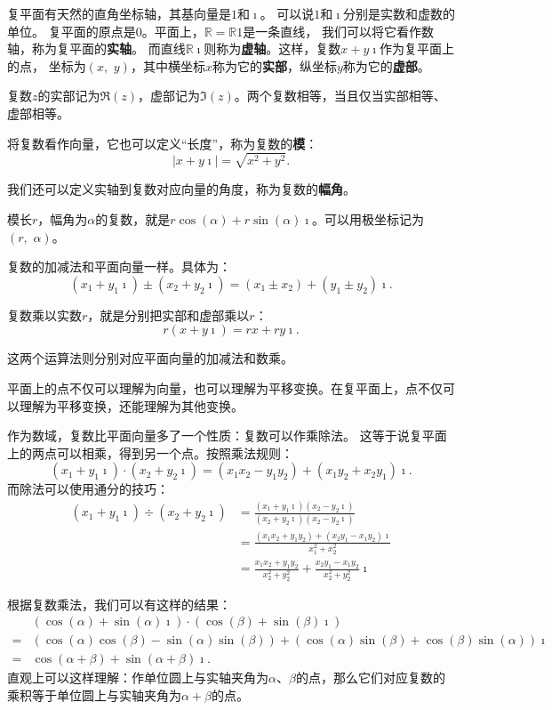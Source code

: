 \documentclass[12pt,UTF8]{ctexbook}
\theoremstyle{definition}
\theoremstyle{plain}
\begin{document}
复平面有天然的直角坐标轴，其基向量是$1$和$\imath$。
可以说$1$和$\imath$分别是实数和虚数的单位。
复平面的原点是$0$。平面上，$\mathbb{R} = \mathbb{R}1$是一条直线，
我们可以将它看作数轴，称为复平面的\textbf{实轴}。
而直线$\mathbb{R}\imath$则称为\textbf{虚轴}。这样，复数$x+y\imath$作为复平面上的点，
坐标为$(x,\,\,y)$，其中横坐标$x$称为它的\textbf{实部}，纵坐标$y$称为它的\textbf{虚部}。

复数$z$的实部记为$\Re(z)$，虚部记为$\Im(z)$。两个复数相等，当且仅当实部相等、虚部相等。

将复数看作向量，它也可以定义“长度”，称为复数的\textbf{模}：
$$ |x + y\imath| = \sqrt{x^2 + y^2}.$$

我们还可以定义实轴到复数对应向量的角度，称为复数的\textbf{幅角}。

模长$r$，幅角为$\alpha$的复数，就是$r\cos{(\alpha)} + r\sin{(\alpha)}\imath$。可以用极坐标记为$(r,\,\,\alpha)$。

复数的加减法和平面向量一样。具体为：
$$ (x_1 + y_1\imath) \pm (x_2 + y_2\imath) = (x_1 \pm x_2) + (y_1 \pm y_2)\imath. $$

复数乘以实数$r$，就是分别把实部和虚部乘以$r$：
$$ r(x + y\imath) = rx + ry\imath. $$

这两个运算法则分别对应平面向量的加减法和数乘。

平面上的点不仅可以理解为向量，也可以理解为平移变换。在复平面上，点不仅可以理解为平移变换，还能理解为其他变换。

作为数域，复数比平面向量多了一个性质：复数可以作乘除法。
这等于说复平面上的两点可以相乘，得到另一个点。按照乘法规则：
$$ (x_1 + y_1\imath) \cdot (x_2 + y_2\imath) = (x_1x_2 - y_1y_2) + (x_1y_2 + x_2y_1)\imath. $$
而除法可以使用通分的技巧：
\begin{align*}
    (x_1 + y_1\imath) \div (x_2 + y_2\imath) &= \frac{(x_1 + y_1\imath)(x_2 - y_2\imath)}{(x_2 + y_2\imath)(x_2 - y_2\imath)} \\
    &= \frac{(x_1x_2 + y_1y_2) + (x_2y_1 - x_1y_2)\imath}{x_1^2 + x_2^2} \\
    &= \frac{x_1x_2 + y_1y_2}{x_2^2 + y_2^2} + \frac{x_2y_1 - x_1y_2}{x_2^2 + y_2^2}\imath
\end{align*}

根据复数乘法，我们可以有这样的结果：
\begin{align*}
     & (\cos{(\alpha)} + \sin{(\alpha)}\imath) \cdot (\cos{(\beta)} + \sin{(\beta)}\imath) \\
    =& (\cos{(\alpha)}\cos{(\beta)} - \sin{(\alpha)}\sin{(\beta)}) + (\cos{(\alpha)}\sin{(\beta)} + \cos{(\beta)}\sin{(\alpha)})\imath \\
    =& \cos{(\alpha + \beta)} + \sin{(\alpha + \beta)}\imath.
\end{align*}
直观上可以这样理解：作单位圆上与实轴夹角为$\alpha$、$\beta$的点，那么它们对应复数的乘积等于单位圆上与实轴夹角为$\alpha+\beta$的点。
\end{document}
